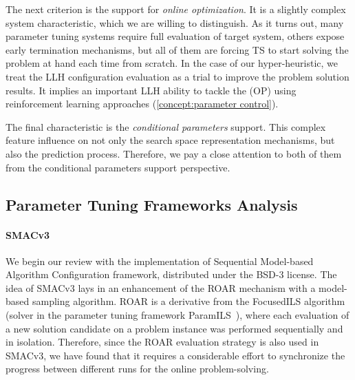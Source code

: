 The next criterion is the support for \emph{online optimization}. It is a slightly complex system characteristic, which we are willing to distinguish. As it turns out, many parameter tuning systems require full evaluation of target system, others expose early termination mechanisms, but all of them are forcing TS to start solving the problem at hand each time from scratch. In the case of our hyper-heuristic, we treat the LLH configuration evaluation as a trial to improve the problem solution results. It implies an important LLH ability to tackle the (OP) using reinforcement learning approaches (\cref{concept:parameter control}).

The final characteristic is the \emph{conditional parameters} support. This complex feature influence on not only the search space representation mechanisms, but also the prediction process. Therefore, we pay a close attention to both of them from the conditional parameters support perspective.

\subsection{Parameter Tuning Frameworks Analysis}\label{impl: Parameter Tuning Frameworks Analysis}
\paragraph{SMACv3}
We begin our review with the implementation of Sequential Model-based Algorithm Configuration framework, distributed under the BSD-3 license. The idea of SMACv3 lays in an enhancement of the ROAR mechanism with a model-based sampling algorithm. ROAR is a derivative from the FocusedILS algorithm (solver in the parameter tuning framework ParamILS~\cite{hutter2009paramils}), where each evaluation of a new solution candidate on a problem instance was performed sequentially and in isolation. Therefore, since the ROAR evaluation strategy is also used in SMACv3, we have found that it requires a considerable effort to synchronize the progress between different runs for the online problem-solving.

